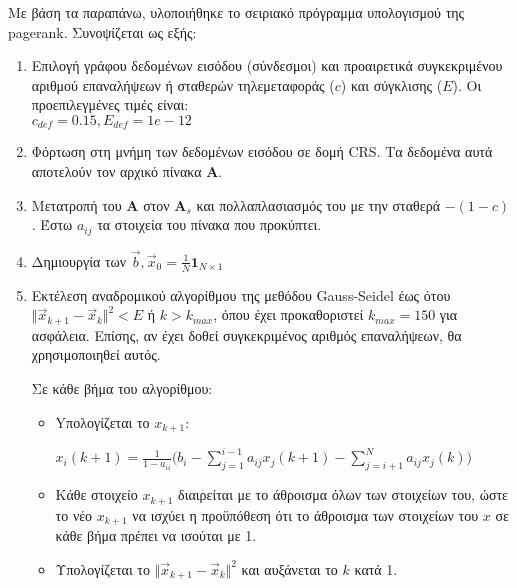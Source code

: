 Με βάση τα παραπάνω, υλοποιήθηκε το σειριακό πρόγραμμα υπολογισμού της pagerank. Συνοψίζεται ως εξής:
\begin{enumerate}

\item Επιλογή γράφου δεδομένων εισόδου (σύνδεσμοι) και προαιρετικά συγκεκριμένου αριθμού επαναλήψεων ή σταθερών τηλεμεταφοράς ($c$) και σύγκλισης ($E$). Οι προεπιλεγμένες τιμές είναι: \\ $c_{def} = 0.15, E_{def} = 1e-12$

\item Φόρτωση στη μνήμη των δεδομένων εισόδου σε δομή CRS. Tα δεδομένα αυτά αποτελούν τον αρχικό πίνακα $\bm{A}$.

\item Μετατροπή του $\bm{A}$ στον $\bm{A}_s$ και πολλαπλασιασμός του με την σταθερά $-(1-c)$. Έστω $a_{ij}$ τα στοιχεία του πίνακα που προκύπτει.

\item Δημιουργία των $\vec{b},\vec{x}_0=\frac{1}{N}\bm{1}_{N\times1}$

\item Εκτέλεση αναδρομικού αλγορίθμου της μεθόδου Gauss-Seidel έως ότου $\Vert\vec{x}_{k+1}-\vec{x}_k\Vert^2 < E$ ή $k > k_{max}$, όπου έχει προκαθοριστεί $k_{max} = 150$ για ασφάλεια. Επίσης, αν έχει δοθεί συγκεκριμένος αριθμός επαναλήψεων, θα χρησιμοποιηθεί αυτός.

Σε κάθε βήμα του αλγορίθμου:
\begin{itemize}[leftmargin=*]
\item Yπολογίζεται το $x_{k+1}$:

\hfil$\displaystyle x_i(k+1) = \frac{1}{1-a_{ii}}\bigg(b_i-\sum_{j=1}^{i-1}a_{ij}x_j(k+1)-\sum_{j=i+1}^{N}a_{ij}x_j(k)\bigg)$\hfil

\item Κάθε στοιχείο $x_{k+1}$ διαιρείται με το άθροισμα όλων των στοιχείων του, ώστε το νέο $x_{k+1}$ να ισχύει η προϋπόθεση ότι το άθροισμα των στοιχείων του $x$ σε κάθε βήμα πρέπει να ισούται με 1.

\item Υπολογίζεται το $\Vert\vec{x}_{k+1}-\vec{x}_k\Vert^2$ και αυξάνεται το $k$ κατά 1.

\end{itemize}
\end{enumerate}